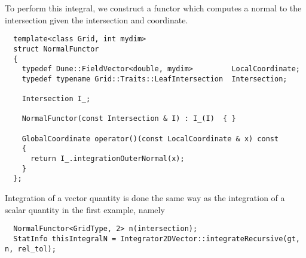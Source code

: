 \noindent
To perform this integral, we construct a functor which computes a normal to the intersection given the intersection and coordinate. \\

\begin{mybox}
\begin{lstlisting}
  template<class Grid, int mydim>
  struct NormalFunctor
  {
	typedef Dune::FieldVector<double, mydim>         LocalCoordinate;
	typedef typename Grid::Traits::LeafIntersection  Intersection;

	Intersection I_;

	NormalFunctor(const Intersection & I) : I_(I)  { }

	GlobalCoordinate operator()(const LocalCoordinate & x) const
    {
      return I_.integrationOuterNormal(x);
    }
  };
\end{lstlisting}
\end{mybox}

Integration of a vector quantity is done the same way as the integration of a scalar quantity in the first example, namely \\

\begin{mybox}
\begin{lstlisting}
  NormalFunctor<GridType, 2> n(intersection);
  StatInfo thisIntegralN = Integrator2DVector::integrateRecursive(gt, n, rel_tol);
\end{lstlisting}
\end{mybox}




